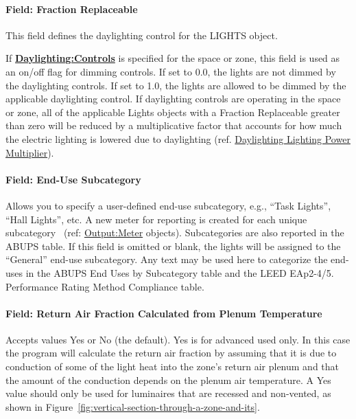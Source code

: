 \paragraph{Field: Fraction Replaceable}\label{field-fraction-replaceable}

This field defines the daylighting control for the LIGHTS object.

If \textbf{\hyperref[daylightingcontrols-000]{Daylighting:Controls}} is specified for the space or zone, this field is used as an on/off flag for dimming controls. If set to 0.0, the lights are not dimmed by the daylighting controls. If set to 1.0, the lights are allowed to be dimmed by the applicable daylighting control. If daylighting controls are operating in the space or zone, all of the applicable Lights objects with a Fraction Replaceable greater than zero will be reduced by a multiplicative factor that accounts for how much the electric lighting is lowered due to daylighting (ref. \hyperref[daylighting-lighting-power-multiplier-1]{Daylighting Lighting Power Multiplier}).


\paragraph{Field: End-Use Subcategory}\label{field-end-use-subcategory-002}

Allows you to specify a user-defined end-use subcategory, e.g., ``Task Lights'', ``Hall Lights'', etc. A new meter for reporting is created for each unique subcategory~ (ref: \hyperref[outputmeter-and-outputmetermeterfileonly]{Output:Meter} objects). Subcategories are also reported in the ABUPS table. If this field is omitted or blank, the lights will be assigned to the ``General'' end-use subcategory. Any text may be used here to categorize the end-uses in the ABUPS End Uses by Subcategory table and the LEED EAp2-4/5. Performance Rating Method Compliance table.

\paragraph{Field: Return Air Fraction Calculated from Plenum Temperature}\label{field-return-air-fraction-calculated-from-plenum-temperature}

Accepts values Yes or No (the default). Yes is for advanced used only. In this case the program will calculate the return air fraction by assuming that it is due to conduction of some of the light heat into the zone's return air plenum and that the amount of the conduction depends on the plenum air temperature. A Yes value should only be used for luminaires that are recessed and non-vented, as shown in Figure~\ref{fig:vertical-section-through-a-zone-and-its}.

